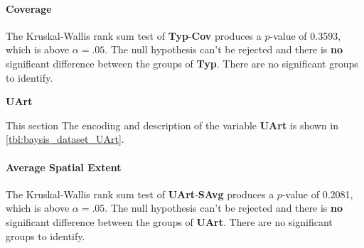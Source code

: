 \paragraph{Coverage}
The Kruskal-Wallis rank sum test of \textbf{Typ}-\textbf{Cov} produces a $p$-value of 0.3593, which is above $\alpha=.05$. The null hypothesis can't be rejected and there is \textbf{no} significant difference between the groups of \textbf{Typ}. There are no significant groups to identify.

\Large
\centerline{\textbf{UArt}}
\normalsize
This section
The encoding and description of the variable \textbf{UArt} is shown in \autoref{tbl:baysis_dataset_UArt}. 

\paragraph{Average Spatial Extent}
The Kruskal-Wallis rank sum test of \textbf{UArt}-\textbf{SAvg} produces a $p$-value of 0.2081, which is above $\alpha=.05$. The null hypothesis can't be rejected and there is \textbf{no} significant difference between the groups of \textbf{UArt}. There are no significant groups to identify.

